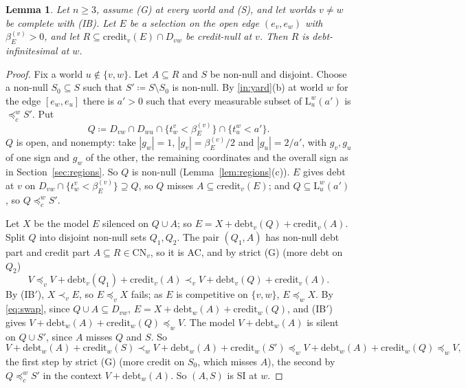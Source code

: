 \documentclass[11pt]{article}
\newtheorem{lemma}[theorem]{Lemma}
\theoremstyle{definition}\newtheorem{definition}[theorem]{Definition}
\theoremstyle{remark}\newtheorem{remark}[theorem]{Remark}
\newcommand{\debt}{\mathrm{debt}}
\newcommand{\cred}{\mathrm{credit}}
\newcommand{\Lo}[3]{\mathrm L^{#1}_{#2}(#3)}
\newcommand{\CN}{\mathrm{CN}}
\begin{document}
\begin{lemma}\label{lem:CNtoDI}
Let $n\ge3$, assume (G) at every world and (S), and let worlds $v\ne w$ be
complete with (IB). Let $E$ be a selection on the open edge $(e_v,e_w)$
with $\beta^{(v)}_E>0$, and let $R\subseteq\cred_v(E)\cap D_{vw}$ be
credit-null at $v$. Then $R$ is debt-infinitesimal at $w$.
\end{lemma}
\begin{proof}
Fix a world $u\notin\{v,w\}$. Let $A\subseteq R$ and $S$ be non-null and
disjoint. Choose a non-null $S_0\subseteq S$ such that $S'\coloneqq
S\setminus S_0$ is non-null. By \ref{in:yard}(b) at world $w$ for the edge
$[e_w,e_u]$ there is $a'>0$ such that every measurable subset of $\Lo
wu{a'}$ is $\preceq^w_cS'$. Put
\[
 Q\coloneqq D_{vw}\cap D_{wu}\cap\{t^v_w<\beta^{(v)}_E\}\cap\{t^w_u<a'\}.
\]
$Q$ is open, and nonempty: take $|g_w|=1$, $|g_v|=\beta^{(v)}_E/2$ and
$|g_u|=2/a'$, with $g_v,g_u$ of one sign and $g_w$ of the other, the
remaining coordinates and the overall sign as in
Section~\ref{sec:regions}. So $Q$ is
non-null (Lemma~\ref{lem:regions}(c)). $E$ gives debt at $v$ on
$D_{vw}\cap\{t^v_w<\beta^{(v)}_E\}\supseteq Q$, so $Q$ misses
$A\subseteq\cred_v(E)$; and $Q\subseteq\Lo wu{a'}$, so $Q\preceq^w_cS'$.

Let $X$ be the model $E$ silenced on $Q\cup A$; so
$E=X+\debt_v(Q)+\cred_v(A)$. Split $Q$ into disjoint non-null sets
$Q_1,Q_2$. The pair $(Q_1,A)$ has non-null debt part and credit part
$A\subseteq R\in\CN_v$, so it is AC, and by strict (G) (more debt on $Q_2$)
\[
 V\preceq_vV+\debt_v(Q_1)+\cred_v(A)\prec_vV+\debt_v(Q)+\cred_v(A).
\]
By (IB$'$), $X\prec_vE$, so $E\preceq_vX$ fails; as $E$ is competitive on
$\{v,w\}$, $E\preceq_wX$.
By \eqref{eq:swap}, since $Q\cup A\subseteq D_{vw}$,
$E=X+\debt_w(A)+\cred_w(Q)$, and (IB$'$) gives
$V+\debt_w(A)+\cred_w(Q)\preceq_wV$. The model $V+\debt_w(A)$ is silent on
$Q\cup S'$, since $A$ misses $Q$ and $S$. So
\[
 V+\debt_w(A)+\cred_w(S)\prec_wV+\debt_w(A)+\cred_w(S')\preceq_w
 V+\debt_w(A)+\cred_w(Q)\preceq_wV,
\]
the first step by strict (G) (more credit on $S_0$, which misses $A$), the
second by $Q\preceq^w_cS'$ in the context $V+\debt_w(A)$. So $(A,S)$ is SI
at $w$.
\end{proof}
\end{document}
